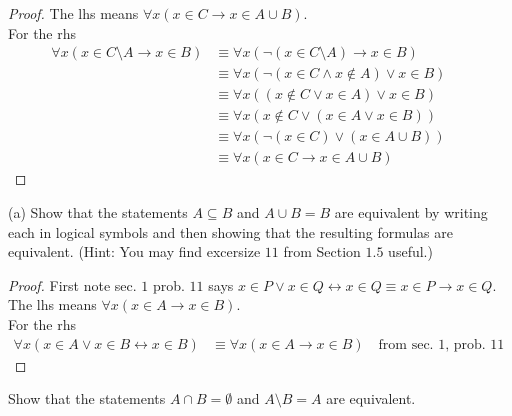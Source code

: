 \begin{proof}
    The lhs means $\forall{x}(x \in C \rightarrow x \in A \cup B)$. \\
    For the rhs
    \begin{align*}
        \forall{x}(x \in C \setminus A \rightarrow x \in B) 
            &\equiv \forall{x}(\neg(x \in C \setminus A) \rightarrow x \in B) && \\
            &\equiv \forall{x}(\neg(x \in C \wedge x \not \in A) \vee x \in B) && \\
            &\equiv \forall{x}((x \not \in C \vee x \in A) \vee x \in B) && \\
            &\equiv \forall{x}(x \not \in C \vee (x \in A \vee x \in B)) && \\
            &\equiv \forall{x}(\neg(x \in C) \vee (x \in A \cup B)) && \\
            &\equiv \forall{x}(x \in C \rightarrow x \in A \cup B)
    \end{align*}
\end{proof}

\begin{tcolorbox}[title=Problem 13, breakable]
    (a) Show that the statements $A \subseteq B$ and $A \cup B = B$ are equivalent by
    writing each in logical symbols and then showing that the resulting formulas are 
    equivalent. (Hint: You may find excersize $11$ from Section $1.5$ useful.)
\end{tcolorbox}

\begin{proof}
    First note sec. $1$ prob. $11$ says $x \in P \vee x \in Q \leftrightarrow x \in Q \equiv x \in P \rightarrow x \in Q$. \\
    The lhs means $\forall{x}(x \in A \rightarrow x \in B)$. \\
    For the rhs
    \begin{align*}
        \forall{x}(x \in A \vee x \in B \leftrightarrow x \in B)
            &\equiv \forall{x}(x \in A \rightarrow x \in B) \quad \text{from sec. $1$, prob. $11$} &&
    \end{align*}
\end{proof}

\begin{tcolorbox}[title=Problem 14, breakable]
    Show that the statements $A \cap B = \emptyset$ and $A \setminus B = A$ are equivalent.
\end{tcolorbox}


